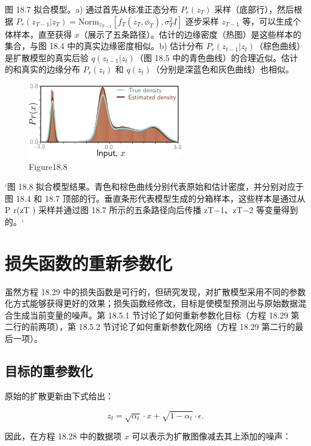 图 18.7 拟合模型。a) 通过首先从标准正态分布 \( P_r(z_T) \) 采样（底部行），然后根据 \( P_r(z_{T-1} | z_T) = \text{Norm}_{z_{T-1}}[f_T(z_T, \phi_T), \sigma_T^2 I] \) 逐步采样 \( z_{T-1} \) 等，可以生成个体样本，直至获得 \( x \)（展示了五条路径）。估计的边缘密度（热图）是这些样本的集合，与图 18.4 中的真实边缘密度相似。b) 估计分布 \( P_r(z_{t-1} | z_t) \)（棕色曲线）是扩散模型的真实后验 \( q(z_{t-1} | z_t) \)（图 18.5 中的青色曲线）的合理近似。估计的和真实的边缘分布 \( P_r(z_t) \) 和 \( q(z_t) \)（分别是深蓝色和灰色曲线）也相似。

\begin{figure}[ht!]
\centering
\includegraphics[width=0.7\linewidth]{png/chapter18/DiffusionResultsFinal.png}
\caption{Figure18.8}
\end{figure}

`图 18.8 拟合模型结果。青色和棕色曲线分别代表原始和估计密度，并分别对应于图 18.4 和 18.7 顶部的行。垂直条形代表模型生成的分箱样本，这些样本是通过从 P r(zT ) 采样并通过图 18.7 所示的五条路径向后传播 zT−1、zT−2 等变量得到的。`

\section{损失函数的重新参数化}
虽然方程 18.29 中的损失函数是可行的，但研究发现，对扩散模型采用不同的参数化方式能够获得更好的效果；损失函数经修改，目标是使模型预测出与原始数据混合生成当前变量的噪声。第 18.5.1 节讨论了如何重新参数化目标（方程 18.29 第二行的前两项），第 18.5.2 节讨论了如何重新参数化网络（方程 18.29 第二行的最后一项）。


\subsection{目标的重参数化}
原始的扩散更新由下式给出：

\begin{equation}
z_t = \sqrt{\alpha_t} \cdot x + \sqrt{1 - \alpha_t} \cdot \epsilon. 
\end{equation}

因此，在方程 18.28 中的数据项 \(x\) 可以表示为扩散图像减去其上添加的噪声：

